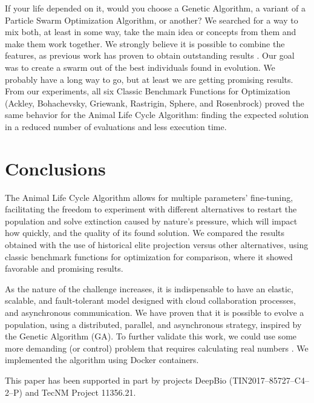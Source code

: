 \documentclass[graybox]{svmult}
\begin{document}
    If your life depended on it, would you choose a Genetic Algorithm, a
    variant of a Particle Swarm Optimization Algorithm, or another? We searched
    for a way to mix both, at least in some way, take the main idea or concepts
    from them and make them work together. We strongly believe it is possible
    to combine the features, as previous work has proven to obtain outstanding
    results \cite{garcia2015evospace,garcia2021event,valdez2021container,valdez2021swarm}.
    Our goal was to create a swarm out of the best individuals found in
    evolution. We probably have a long way to go, but at least we are getting
    promising results. From our experiments, all six Classic Benchmark
    Functions for Optimization (Ackley, Bohachevsky, Griewank, Rastrigin,
    Sphere, and Rosenbrock) proved the same behavior for the Animal Life Cycle
    Algorithm: finding the expected solution in a reduced number of evaluations
    and less execution time.


\section{Conclusions}
    \label{section.conclusions}

    The Animal Life Cycle Algorithm allows for multiple parameters'
    fine-tuning, facilitating the freedom to experiment with different
    alternatives to restart the population and solve extinction caused by
    nature's pressure, which will impact how quickly, and the quality of its
    found solution. We compared the results obtained with the use of historical
    elite projection versus other alternatives, using classic benchmark
    functions for optimization for comparison, where it showed favorable and
    promising results.

    As the nature of the challenge increases, it is indispensable to have an
    elastic, scalable, and fault-tolerant model designed with cloud
    collaboration processes, and asynchronous communication. We have proven
    that it is possible to evolve a population, using a distributed, parallel,
    and asynchronous strategy, inspired by the Genetic Algorithm (GA). To
    further validate this work, we could use some more demanding (or control)
    problem that requires calculating real numbers
    \cite{stanley2002evolving,miikkulainen2019evolving}. We implemented the
    algorithm using Docker containers.


\begin{acknowledgement}
    This paper has been supported in part by projects DeepBio (TIN2017--85727--C4--2--P) and TecNM Project 11356.21\@.
\end{acknowledgement}

%


%

%
\end{document}
